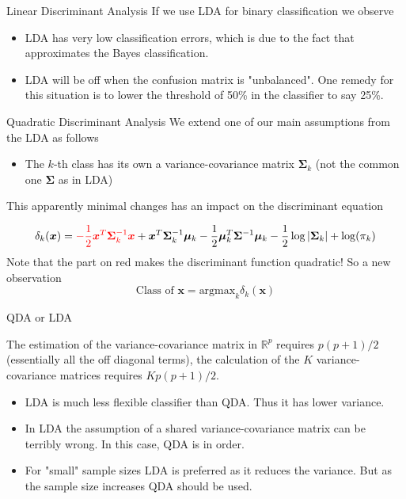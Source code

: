\documentclass{beamer}
\begin{document}
\begin{frame}{Linear Discriminant Analysis}
	If we use LDA for binary classification we observe
	\begin{itemize}
		\item LDA has very low classification errors, which is due to the fact that approximates the Bayes classification.
		\item LDA will be off when the confusion matrix is "unbalanced". One remedy for this situation is to lower the threshold of 50\% in the classifier to say 25\%. 
	\end{itemize}
\end{frame}

\begin{frame}{Quadratic Discriminant Analysis}
	We extend one of our main assumptions from the LDA as follows
	
	\begin{itemize}
		\item The $k$-th class has its own a variance-covariance matrix $\bm{\Sigma}_k$ (not the common one $\bm{\Sigma}$ as in LDA)
	\end{itemize}
	This apparently minimal changes has an impact on the discriminant equation
	
	\begin{equation}
	\delta_k(\bm{x})= {\color{red} -\frac{1}{2}\bm{x}^T \bm{\Sigma}_k^{-1} \bm{x}}+       
	\bm{x}^T \bm{\Sigma}_k^{-1} \bm{\mu}_k - \frac{1}{2} \bm{\mu}_k^T \bm{\Sigma}^{-1}\bm{\mu}_k - \frac{1}{2} \log |\bm{\Sigma}_k| 
	+ \log(\pi_k)
	\end{equation}
Note that the part on red makes the discriminant function quadratic! 
So a new observation 
\begin{equation*}
		\textrm{Class of } \bm{x}=  \textrm{argmax}_k \delta_k(\bm{x})
\end{equation*}

\end{frame}

\begin{frame}{QDA or LDA}
	
	The estimation of the variance-covariance matrix in $\mathbb{R}^p$ requires $p (p+1)/2$ (essentially all the off diagonal terms), the calculation of the $K$ variance-covariance matrices requires $Kp(p+1)/2$. 
	\begin{itemize}
		\item LDA is much less flexible classifier than QDA. Thus it has lower variance.
		\item In LDA the assumption of a shared variance-covariance matrix can be terribly wrong. In this case, QDA is in order.
		\item For "small" sample sizes LDA is preferred as it reduces the variance. But as the sample size increases QDA should be used.
\end{itemize}
\end{frame}
\end{document}
